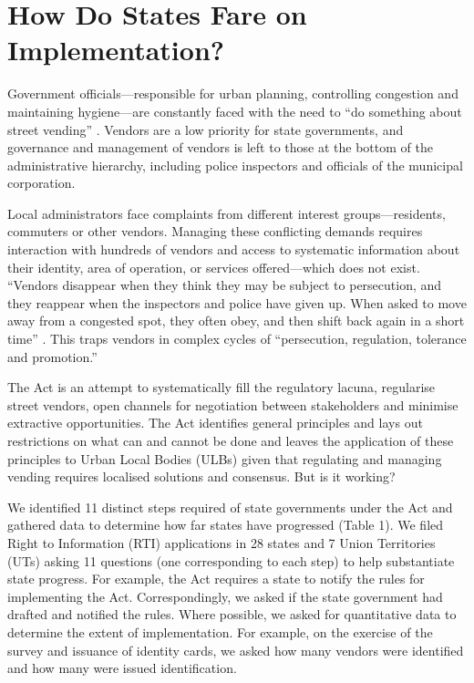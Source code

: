 \documentclass[a4paper, 12pt, twoside]{article}
\begin{document}
\section{How Do States Fare on Implementation?}
	Government officials—responsible for urban planning, controlling congestion and maintaining hygiene—are constantly faced with the need to “do something about street vending” \parencite{Bromley 2000}. Vendors are a low priority for state governments, and governance and management of vendors is left to those at the bottom of the administrative hierarchy, including police inspectors and officials of the municipal corporation.

	Local administrators face complaints from different interest groups—residents, commuters or other vendors. Managing these conflicting demands requires interaction with hundreds of vendors and access to systematic information about their identity, area of operation, or services offered—which does not exist. “Vendors disappear when they think they may be subject to persecution, and they reappear when the inspectors and police have given up. When asked to move away from a congested spot, they often obey, and then shift back again in a short time” \parencite{ibid.}. This traps vendors in complex cycles of “persecution, regulation, tolerance and promotion.” 

	The Act is an attempt to systematically fill the regulatory lacuna, regularise street vendors, open channels for negotiation between stakeholders and minimise extractive opportunities. The Act identifies general principles and lays out restrictions on what can and cannot be done and leaves the application of these principles to Urban Local Bodies (ULBs) given that regulating and managing vending requires localised solutions and consensus. But is it working?

	We identified 11 distinct steps required of state governments under the Act and gathered data to determine how far states have progressed (Table 1). We filed Right to Information (RTI) applications in 28 states and 7 Union Territories (UTs)  asking 11 questions (one corresponding to each step) to help substantiate state progress. For example, the Act requires a state to notify the rules for implementing the Act. Correspondingly, we asked if the state government had drafted and notified the rules. Where possible, we asked for quantitative data to determine the extent of implementation. For example, on the exercise of the survey and issuance of identity cards, we asked how many vendors were identified and how many were issued identification.
	
\end{document}
